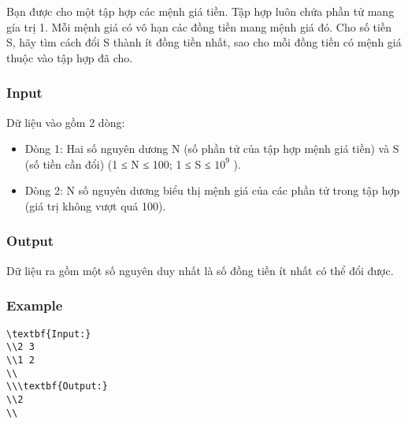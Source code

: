 



   Bạn được cho một tập hợp các mệnh giá tiền. Tập hợp luôn chứa phần tử mang gía trị 1. Mỗi mệnh giá có vô hạn các đồng tiền mang mệnh giá đó. Cho số tiền S, hãy tìm cách đổi S thành ít đồng tiền nhất, sao cho mỗi đồng tiền có mệnh giá thuộc vào tập hợp đã cho.  

\subsubsection{   Input  }

   Dữ liệu vào gồm 2 dòng:  
\begin{itemize}
	\item     Dòng 1: Hai số nguyên dương N (số phần tử của tập hợp mệnh giá tiền) và S (số tiền cần đổi) (1 ≤ N ≤ 100; 1 ≤ S ≤ $10^{9}$    ).   
	\item     Dòng 2: N số nguyên dương biểu thị mệnh giá của các phần tử trong tập hợp (giá trị không vượt quá 100).   
\end{itemize}

\subsubsection{   Output  }

   Dữ liệu ra gồm một số nguyên duy nhất là số đồng tiền ít nhất có thể đổi được.  

\subsubsection{   Example  }
\begin{verbatim}
\textbf{Input:}
\\2 3
\\1 2
\\
\\\textbf{Output:}
\\2
\\\end{verbatim}
